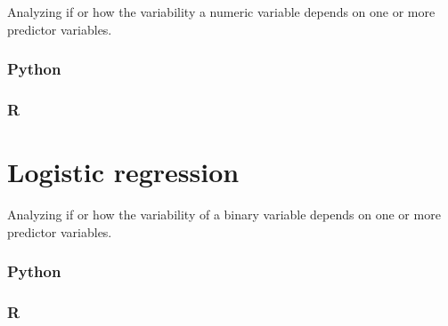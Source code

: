 \documentclass[
]{book}
\begin{document}
Analyzing if or how the variability a numeric variable depends on one or more predictor variables.

\hypertarget{python-46}{%
\subsubsection*{Python}\label{python-46}}

\hypertarget{r-46}{%
\subsubsection*{R}\label{r-46}}

\hypertarget{logistic-regression}{%
\section{Logistic regression}\label{logistic-regression}}

Analyzing if or how the variability of a binary variable depends on one or more predictor variables.

\hypertarget{python-47}{%
\subsubsection*{Python}\label{python-47}}

\hypertarget{r-47}{%
\subsubsection*{R}\label{r-47}}

  
\end{document}

